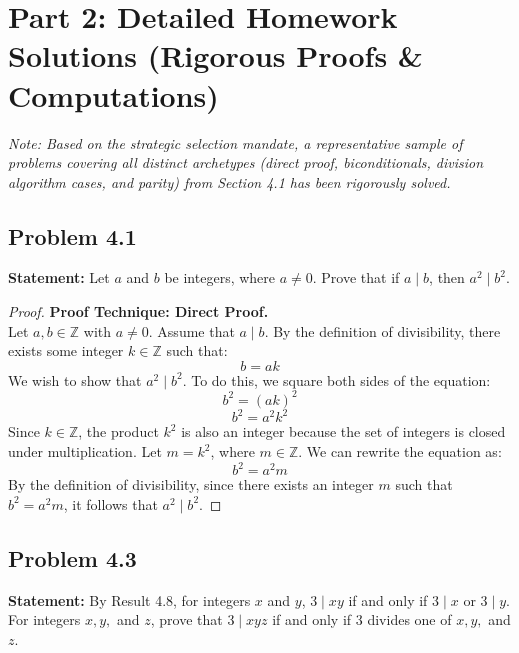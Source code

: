 \documentclass[11pt]{article}
\theoremstyle{definition}
\theoremstyle{remark}
\newcommand{\Z}{\mathbb{Z}}
\begin{document}
\newpage
\section{Part 2: Detailed Homework Solutions (Rigorous Proofs \& Computations)}

\textit{Note: Based on the strategic selection mandate, a representative sample of problems covering all distinct archetypes (direct proof, biconditionals, division algorithm cases, and parity) from Section 4.1 has been rigorously solved.}

\subsection{Problem 4.1}
\textbf{Statement:} Let $a$ and $b$ be integers, where $a \neq 0$. Prove that if $a \mid b$, then $a^2 \mid b^2$.

\begin{proof}
\textbf{Proof Technique: Direct Proof.} \\
Let $a, b \in \Z$ with $a \neq 0$. Assume that $a \mid b$. 
By the definition of divisibility, there exists some integer $k \in \Z$ such that:
\[ b = ak \]
We wish to show that $a^2 \mid b^2$. To do this, we square both sides of the equation:
\[ b^2 = (ak)^2 \]
\[ b^2 = a^2 k^2 \]
Since $k \in \Z$, the product $k^2$ is also an integer because the set of integers is closed under multiplication. Let $m = k^2$, where $m \in \Z$. We can rewrite the equation as:
\[ b^2 = a^2 m \]
By the definition of divisibility, since there exists an integer $m$ such that $b^2 = a^2 m$, it follows that $a^2 \mid b^2$.
\end{proof}

\subsection{Problem 4.3}
\textbf{Statement:} By Result 4.8, for integers $x$ and $y$, $3 \mid xy$ if and only if $3 \mid x$ or $3 \mid y$. For integers $x, y,$ and $z$, prove that $3 \mid xyz$ if and only if $3$ divides one of $x, y,$ and $z$.
\end{document}

